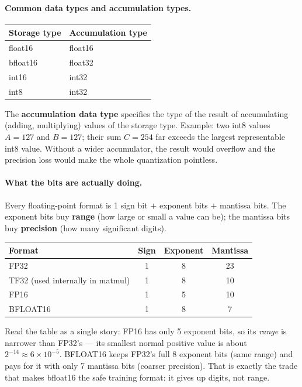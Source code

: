 \documentclass[11pt,a4paper]{article}
\begin{document}
\paragraph{Common data types and accumulation types.}
\begin{center}
\begin{tabularx}{\textwidth}{lY}
\textbf{Storage type} & \textbf{Accumulation type} \\
\hline
float16 & float16 \\
bfloat16 & float32 \\
int16 & int32 \\
int8 & int32 \\
\end{tabularx}
\end{center}
The \textbf{accumulation data type} specifies the type of the result of accumulating (adding,
multiplying) values of the storage type. Example: two int8 values $A = 127$ and $B = 127$;
their sum $C = 254$ far exceeds the largest representable int8 value. Without a wider
accumulator, the result would overflow and the precision loss would make the whole
quantization pointless.

\paragraph{What the bits are actually doing.} Every floating-point format is
1 sign bit $+$ exponent bits $+$ mantissa bits. The exponent bits buy \textbf{range} (how
large or small a value can be); the mantissa bits buy \textbf{precision} (how many significant
digits).
\begin{center}
\begin{tabular}{lccc}
\textbf{Format} & \textbf{Sign} & \textbf{Exponent} & \textbf{Mantissa} \\
\hline
FP32 & 1 & 8 & 23 \\
TF32 (used internally in matmul) & 1 & 8 & 10 \\
FP16 & 1 & 5 & 10 \\
BFLOAT16 & 1 & 8 & 7 \\
\end{tabular}
\end{center}
Read the table as a single story: FP16 has only 5 exponent bits, so its \emph{range} is
narrower than FP32's --- its smallest normal positive value is about
$2^{-14} \approx 6 \times 10^{-5}$. BFLOAT16 keeps FP32's full 8 exponent bits (same range)
and pays for it with only 7 mantissa bits (coarser precision). That is exactly the trade that
makes bfloat16 the safe training format: it gives up digits, not range.
\end{document}
